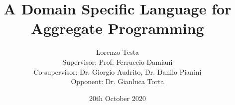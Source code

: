 \documentclass[10pt]{beamer} %
\begin{document}
\title{A Domain Specific Language for Aggregate Programming}
\date{20th October 2020}
\author{Lorenzo Testa \\[0.8cm] Supervisor: Prof. Ferruccio Damiani \\ Co-supervisor: Dr. Giorgio Audrito, Dr. Danilo Pianini \\ Opponent: Dr. Gianluca Torta}

\newcommand*\sequence[1]{$\overline{#1}$}
\end{document}

